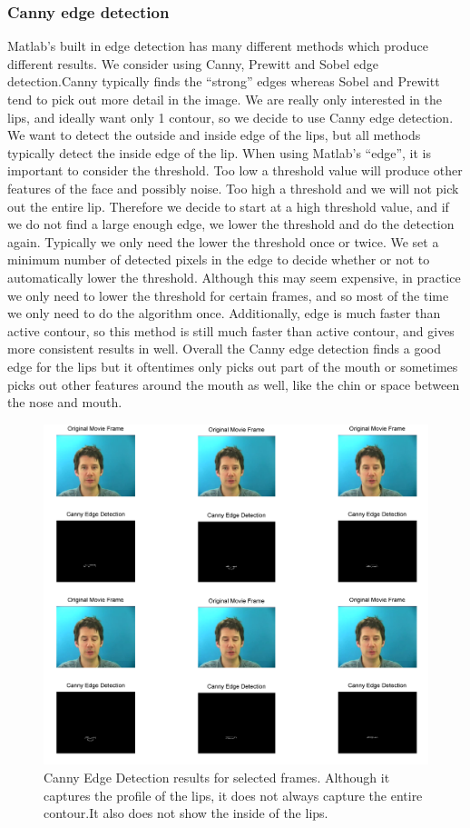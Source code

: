\documentclass[a4paper,11pt]{article}
\begin{document}
\subsubsection{Canny edge detection}
Matlab's built in edge detection has many different methods which produce different results. We consider using Canny, Prewitt and Sobel edge detection.Canny typically finds the ``strong'' edges whereas Sobel and Prewitt tend to pick out more detail in the image. We are really only interested in the lips, and ideally want only 1 contour, so we decide to use Canny edge detection. We want to detect the outside and inside edge of the lips, but all methods typically detect  the inside edge of the lip. When using Matlab's ``edge'', it is important to consider the threshold. Too low a threshold value will produce other features of the face and possibly noise. Too high a threshold and we will not pick out the entire lip. Therefore we decide to start at a high threshold value, and if we do not find a large enough edge, we lower the threshold and do the detection again. Typically we only need the lower the threshold once or twice. We set a minimum number of detected pixels in the edge to decide whether or not to automatically lower the threshold. Although this may seem expensive, in practice we only need to lower the threshold for certain frames, and so most of the time we only need to do the algorithm once.  Additionally, edge is much faster than active contour, so this method is still much faster than active contour, and gives more consistent results in well. Overall the Canny edge detection finds a good edge for the lips but it oftentimes only picks out part of the mouth or sometimes picks out other features around the mouth as well, like the chin or space between the nose and mouth.\par
\begin{figure}[!ht]
	\includegraphics[width=1\textwidth, height=0.75\textwidth]{canny1.png}
	\caption{Canny Edge Detection results for selected frames. Although it captures the profile of the lips, it does not always capture the entire contour.It also does not show the inside of the lips.}
\end{figure} 
\end{document}
